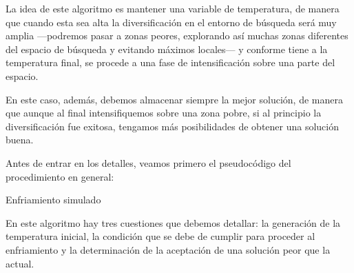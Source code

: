 \documentclass[a4paper, 11pt, titlepage]{article}
\begin{document}
    La idea de este algoritmo es mantener una variable de temperatura, de manera que cuando esta sea alta la diversificación en el entorno de búsqueda será muy amplia ---podremos pasar a zonas peores, explorando así muchas zonas diferentes del espacio de búsqueda y evitando máximos locales--- y conforme tiene a la temperatura final, se procede a una fase de intensificación sobre una parte del espacio.

    En este caso, además, debemos almacenar siempre la mejor solución, de manera que aunque al final intensifiquemos sobre una zona pobre, si al principio la diversificación fue exitosa, tengamos más posibilidades de obtener una solución buena.

    Antes de entrar en los detalles, veamos primero el pseudocódigo del procedimiento en general:

    \begin{algorithm}
        \caption{Enfriamiento simulado}\label{enfSimul}
        \begin{algorithmic}[1]
            \State s $\gets$ genInitSolution()
            \State bestSolution $\gets$ s
            \State currentScore, bestScore $\gets$ score(s, train, target)
            \State $t \gets t_0$
            \State neighboursAccepted $\gets$ 0
            \State f $\gets$ genRandomFeature(s)} \Comment{With replacement}
            \State s' $\gets$ genNeighbour(s,f)
            \State newScore $\gets$ score(s', train, target)
            \State $\Delta =$ currentScore - newScore
            \If{$\Delta < 0$ \textbf{or} acceptWorseSolution = True}
            \State currentScore $\gets$ newScore
            \State acceptedNeighbourgs++
            \If{currentScore $>$ bestScore}
            \State bestScore, bestSolution $\gets$ currentScore, s
            \EndIf
            \EndIf
            \EndWhile
            \State $t \gets$ coolingScheme($t$)
            \EndWhile
            \State \Return s, bestScore
            \EndFunction
        \end{algorithmic}
    \end{algorithm}

    En este algoritmo hay tres cuestiones que debemos detallar: la generación de la temperatura inicial, la condición que se debe de cumplir para proceder al enfriamiento y la determinación de la aceptación de una solución peor que la actual.
\end{document}
